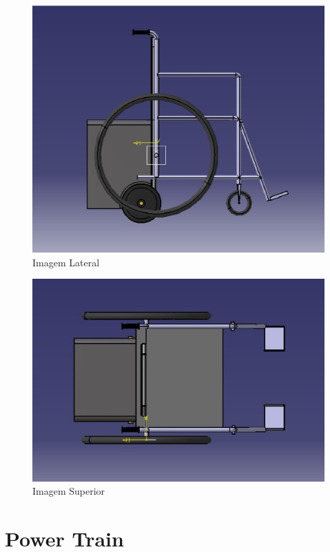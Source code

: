 \begin{figure}[!htb]
\centering
\includegraphics{figuras/estrutura/vista_lateral_cadeira}
\caption{Imagem Lateral}
\label{fig:lateral}
\end{figure}

\begin{figure}[!htb]
\centering
\includegraphics{figuras/estrutura/vista_superior}
\caption{Imagem Superior}
\label{fig:superior}
\end{figure}

\section{Power Train}

